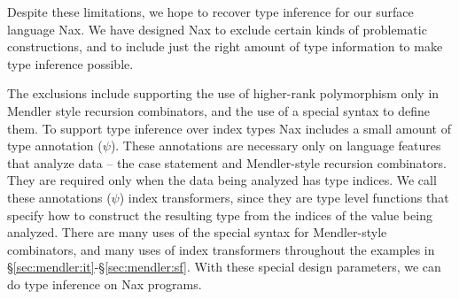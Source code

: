 Despite these limitations, we hope to recover type inference for our surface
language Nax. We have designed Nax to exclude certain kinds of problematic
constructions, and to include just the right amount of type information to
make type inference possible.

The exclusions include supporting the use of higher-rank polymorphism only in
Mendler style recursion combinators, and the use of a special syntax to define
them. To support type inference over index types Nax includes a small amount of
type annotation ($\psi$). These annotations are necessary only on language
features that analyze data -- the case statement and Mendler-style recursion
combinators. They are required only when the data being analyzed has
type indices. We call these annotations ($\psi$) index transformers,
since they are type level functions that specify how to construct
the resulting type from the indices of the value being analyzed.
There are many uses of the special syntax for Mendler-style combinators,
and many uses of index transformers throughout the examples in
\S\ref{sec:mendler:it}-\S\ref{sec:mendler:sf}. 
With these special design parameters, we can do type inference on Nax programs.


